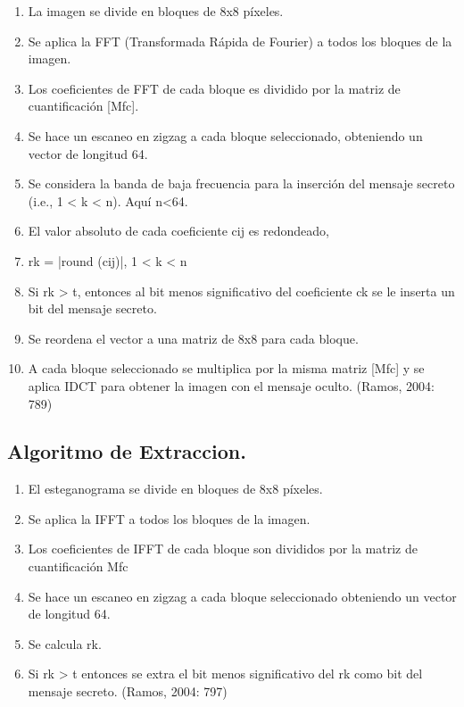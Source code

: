 \documentclass[12pt]{article}
\begin{document}
\begin{enumerate}
\item La imagen se divide en bloques de 8x8 píxeles.
\item Se aplica la FFT (Transformada Rápida de Fourier) a todos los bloques de la imagen.
\item Los coeficientes de FFT de cada bloque es dividido por la matriz de cuantificación [Mfc].
\item Se hace un escaneo en zigzag a cada bloque seleccionado, obteniendo un vector de longitud 64.
\item Se considera la banda de baja frecuencia para la inserción del mensaje secreto (i.e., 1 < k < n). Aquí n<64.
\item El valor absoluto de cada coeficiente cij es redondeado,
\item rk = |round (cij)|, 1 < k < n
\item Si rk > t, entonces al bit menos significativo del coeficiente ck se le inserta un bit del mensaje secreto.
\item Se reordena el vector a una matriz de 8x8 para cada bloque.
\item A cada bloque seleccionado se multiplica por la misma matriz [Mfc] y se aplica IDCT para obtener    la imagen con el mensaje oculto. (Ramos, 2004: 789)
\end{enumerate}

\subsection{Algoritmo de Extraccion.}

\begin{enumerate}
\item El esteganograma se divide en bloques de 8x8 píxeles.
\item Se aplica la IFFT a todos los bloques de la imagen.
\item Los coeficientes de IFFT de cada bloque son divididos por la matriz de cuantificación Mfc
\item Se hace un escaneo en zigzag a cada bloque seleccionado obteniendo un vector de longitud 64.
\item Se calcula rk.
\item Si rk > t entonces se extra el bit menos significativo del rk como bit del mensaje secreto. (Ramos, 2004: 797)
\end{enumerate}
\end{document}
